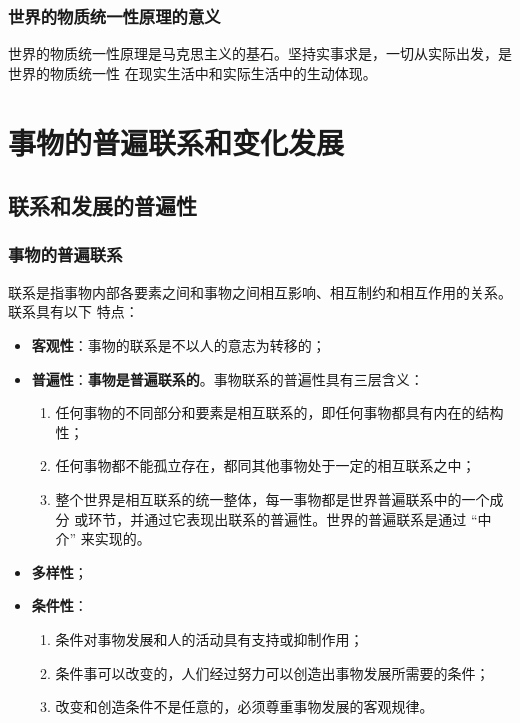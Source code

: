 \documentclass[11pt, UTF8]{book} %
\begin{document}
\subsubsection{世界的物质统一性原理的意义}

世界的物质统一性原理是马克思主义的基石。坚持实事求是，一切从实际出发，是世界的物质统一性
在现实生活中和实际生活中的生动体现。

\section{事物的普遍联系和变化发展}

\subsection{联系和发展的普遍性}

\subsubsection{事物的普遍联系}

联系是指事物内部各要素之间和事物之间相互影响、相互制约和相互作用的关系。联系具有以下
特点：
\begin{itemize}[itemsep=0pt]
    \item \textbf{客观性}：事物的联系是不以人的意志为转移的；
    \item \textbf{普遍性}：\textbf{事物是普遍联系的}。事物联系的普遍性具有三层含义：
    \begin{enumerate}[label={${\arabic*}^\circ$}, itemsep=0pt]
        \item 任何事物的不同部分和要素是相互联系的，即任何事物都具有内在的结构性；
        \item 任何事物都不能孤立存在，都同其他事物处于一定的相互联系之中；
        \item 整个世界是相互联系的统一整体，每一事物都是世界普遍联系中的一个成分
        或环节，并通过它表现出联系的普遍性。世界的普遍联系是通过 “中介” 来实现的。
    \end{enumerate}
    \item \textbf{多样性}；
    \item \textbf{条件性}：
    \begin{enumerate}[label={${\arabic*}^\circ$}, itemsep=0pt]
        \item 条件对事物发展和人的活动具有支持或抑制作用；
        \item 条件事可以改变的，人们经过努力可以创造出事物发展所需要的条件；
        \item 改变和创造条件不是任意的，必须尊重事物发展的客观规律。
    \end{enumerate}
\end{itemize}
\end{document}
